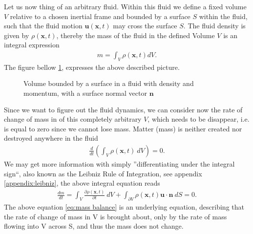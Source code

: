 Let us now thing of an arbitrary fluid. Within this fluid we define a fixed
volume $V$ relative to a chosen inertial frame and bounded by a surface $S$
within the fluid, such that the fluid motion $\mathbf{u}(\mathbf{x}, t)$ may
cross the surface $S$. The fluid density is given by $\rho(\mathbf{x}, t)$,
thereby the mass of the fluid in the defined Volume $V$ is an integral
expression
\begin{align}
    m = \int_V \rho(\mathbf{x}, t) dV.
\end{align}
The figure bellow \ref{fig:volume}, expresses the above described picture.
\begin{figure}[H]
    \centering
  \caption{Volume bounded by a surface in a fluid with density and momentum,
  with a surface normal vector $\mathbf{n}$ \label{fig:volume}}
\end{figure}

Since we want to figure out the fluid dynamics, we can consider now the rate
of change of mass in of this completely arbitrary $V$, which needs to be
disappear, i.e. is equal to zero since we cannot lose mass. Matter (mass) is
neither created nor destroyed anywhere in the fluid
\begin{align}
    \frac{d}{dt}\left( \int_V \rho(\mathbf{x}, t)\ dV \right) = 0.
\end{align}
We may get more information with simply ''differentiating under the integral
sign``, also known as the Leibniz Rule of Integration, see appendix
\ref{appendix:leibniz}, the above integral equation reads
\begin{align}\label{eq:mass balance}
    \frac{dm}{dt} = \int_V \frac{\partial \rho(\mathbf{x}, t)}{\partial t}\ dV
    +\int_{\partial V} \rho(\mathbf{x}, t) \mathbf{u}\cdot\mathbf{n}\ dS
    = 0.
\end{align}
The above equation \ref{eq:mass balance} is an underlying equation, describing that the rate of
change of mass in V is brought about, only by the rate of mass flowing into
V across S, and thus the mass does not change.

